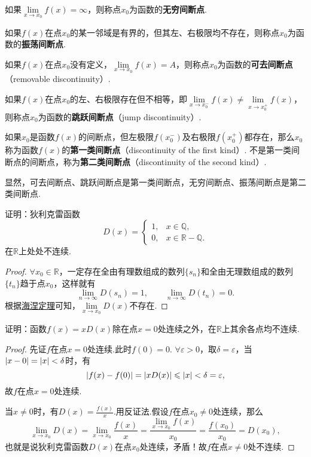 \begin{definition}
如果\(\lim\limits_{x \to x_0}f(x) = \infty\)，则称点\(x_0\)为函数的\textbf{无穷间断点}.

如果\(f(x)\)在点\(x_0\)的某一邻域是有界的，但其左、右极限均不存在，则称点\(x_0\)为函数的\textbf{振荡间断点}.

如果\(f(x)\)在点\(x_0\)没有定义，\(\lim\limits_{x \to x_0}f(x) = A\)，则称点\(x_0\)为函数的\textbf{可去间断点}（removable discontinuity）.

如果\(f(x)\)在点\(x_0\)的左、右极限存在但不相等，即\(\lim\limits_{x \to x_0^-}f(x) \neq \lim\limits_{x \to x_0^+}f(x)\)，则称点\(x_0\)为函数的\textbf{跳跃间断点}（jump discontinuity）.

如果\(x_0\)是函数\(f(x)\)的间断点，但左极限\(f(x_0^-)\)及右极限\(f(x_0^+)\)都存在，那么\(x_0\)称为函数\(f(x)\)的\textbf{第一类间断点}（discontinuity of the first kind）.
不是第一类间断点的间断点，称为\textbf{第二类间断点}（discontinuity of the second kind）.
\end{definition}
显然，可去间断点、跳跃间断点是第一类间断点，无穷间断点、振荡间断点是第二类间断点.

\begin{example}\label{example:极限.狄利克雷函数在实数域上处处不连续}
证明：狄利克雷函数\[
D(x) = \left\{ \begin{array}{ll}
1, & x \in \mathbb{Q}, \\
0, & x \in \mathbb{R} - \mathbb{Q}.
\end{array} \right.
\]在\(\mathbb{R}\)上处处不连续.
\begin{proof}
\(\forall x_0 \in \mathbb{R}\)，一定存在全由有理数组成的数列\(\{s_n\}\)和全由无理数组成的数列\(\{t_n\}\)趋于点\(x_0\)，这样就有\[
\lim\limits_{n\to\infty} D(s_n) = 1,
\qquad
\lim\limits_{n\to\infty} D(t_n) = 0.
\]
根据\hyperref[theorem:极限.海涅定理]{海涅定理}可知，\(\lim\limits_{x \to x_0} D(x)\)不存在.
\end{proof}
\end{example}

\begin{example}
证明：函数\(f(x) = x D(x)\)除在点\(x = 0\)处连续之外，在\(\mathbb{R}\)上其余各点均不连续.
\begin{proof}
先证\(f\)在点\(x = 0\)处连续.此时\(f(0) = 0\).
\(\forall \varepsilon > 0\)，取\(\delta = \varepsilon\)，当\(\abs{x - 0} = \abs{x} < \delta\)时，有\[
\abs{f(x) - f(0)}
= \abs{ x D(x) }
\leqslant \abs{x} < \delta = \varepsilon,
\]故\(f\)在点\(x = 0\)处连续.

当\(x \neq 0\)时，有\(D(x) = \frac{f(x)}{x}\).用反证法.假设\(f\)在点\(x_0 \neq 0\)处连续，那么\[
\lim\limits_{x \to x_0} D(x) = \lim\limits_{x \to x_0} \frac{f(x)}{x}
= \frac{ \lim\limits_{x \to x_0} f(x) }{x_0}
= \frac{f(x_0)}{x_0} = D(x_0),
\]也就是说狄利克雷函数\(D(x)\)在点\(x_0\)处连续，矛盾！故\(f\)在点\(x \neq 0\)处不连续.
\end{proof}
\end{example}

